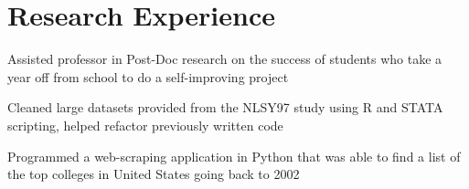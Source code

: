\documentclass[letterpaper]{deedy-resume}
\begin{document}
\begin{minipage}[t]{0.65\textwidth}
\section{Research Experience}

\begin{tightitemize}
\item Assisted professor in Post-Doc research on the success of students who take a year off from school to do a self-improving project \\
\item Cleaned large datasets provided from the NLSY97 study using R and STATA scripting, helped refactor previously written code\\
\item Programmed a web-scraping application in Python that was able to find a list of the top colleges in United States going back to 2002\\ 
\end{tightitemize}
\sectionspace 

\end{minipage}
\end{document}
